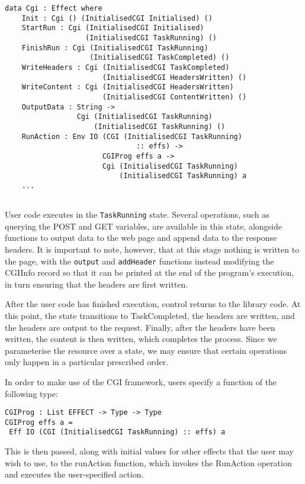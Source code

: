 \documentclass[preprint]{sigplanconf}
\begin{document}
{\small
\begin{verbatim}
data Cgi : Effect where
    Init : Cgi () (InitialisedCGI Initialised) ()
    StartRun : Cgi (InitialisedCGI Initialised) 
                   (InitialisedCGI TaskRunning) ()
    FinishRun : Cgi (InitialisedCGI TaskRunning) 
                    (InitialisedCGI TaskCompleted) ()
    WriteHeaders : Cgi (InitialisedCGI TaskCompleted) 
                       (InitialisedCGI HeadersWritten) ()
    WriteContent : Cgi (InitialisedCGI HeadersWritten) 
                       (InitialisedCGI ContentWritten) ()
    OutputData : String -> 
                 Cgi (InitialisedCGI TaskRunning) 
                     (InitialisedCGI TaskRunning) ()
    RunAction : Env IO (CGI (InitialisedCGI TaskRunning) 
                               :: effs) -> 
                       CGIProg effs a -> 
                       Cgi (InitialisedCGI TaskRunning) 
                           (InitialisedCGI TaskRunning) a
    ...
    
\end{verbatim}
}
User code executes in the \texttt{TaskRunning} state. Several operations, such as querying the POST and GET variables, are available in this state, alongside functions to output data to the web page and append data to the response headers. It is important to note, however, that at this stage nothing is written to the page, with the \texttt{output} and \texttt{addHeader} functions instead modifying the CGIInfo record so that it can be printed at the end of the program's execution, in turn ensuring that the headers are first written.

After the user code has finished execution, control returns to the library code. At this point, the state transitions to TaskCompleted, the headers are written, and the headers are output to the request. Finally, after the headers have been written, the content is then written, which completes the process. Since we parameterise the resource over a state, we may ensure that certain operations only happen in a particular prescribed order.

In order to make use of the CGI framework, users specify a function of the following type:
\begin{verbatim}
CGIProg : List EFFECT -> Type -> Type
CGIProg effs a = 
 Eff IO (CGI (InitialisedCGI TaskRunning) :: effs) a
\end{verbatim}
This is then passed, along with initial values for other effects that the user may wish to use, to the runAction function, which invokes the RunAction operation and executes the user-specified action.
\end{document}
